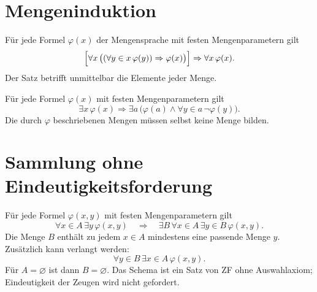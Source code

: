 \section{Mengeninduktion}

\begin{theorem}
\label{b03guide:thm:setinduction}
Für jede Formel $\varphi(x)$ der Mengensprache mit festen
Mengenparametern gilt
\[
 \Bigl[\forall x\,\bigl(
       (\forall y\in x\,\varphi(y))\Rightarrow\varphi(x)\bigr)\Bigr]
      \Rightarrow\forall x\,\varphi(x).
\]
Der Satz betrifft unmittelbar die Elemente jeder Menge.
\cite{miquel}
\end{theorem}

\begin{theorem}
Für jede Formel $\varphi(x)$ mit festen Mengenparametern gilt
\[
 \exists x\,\varphi(x)
 \Rightarrow
 \exists a\,\bigl(\varphi(a)\land
                    \forall y\in a\,\neg\varphi(y)\bigr).
\]
Die durch $\varphi$ beschriebenen Mengen müssen selbst keine
Menge bilden.
\end{theorem}

\section{Sammlung ohne Eindeutigkeitsforderung}

\begin{theorem}[Sammlungsschema]
\label{b03guide:thm:collection}
Für jede Formel $\varphi(x,y)$ mit festen Mengenparametern gilt
\[
 \forall x\in A\,\exists y\,\varphi(x,y)
 \quad\Rightarrow\quad
 \exists B\,\forall x\in A\,\exists y\in B\,\varphi(x,y).
\]
Die Menge $B$ enthält zu jedem $x\in A$ mindestens eine passende
Menge $y$. Zusätzlich kann verlangt werden:
\[
 \forall y\in B\,\exists x\in A\,\varphi(x,y).
\]
Für $A=\varnothing$ ist dann $B=\varnothing$.
Das Schema ist ein Satz von ZF ohne Auswahlaxiom; Eindeutigkeit
der Zeugen wird nicht gefordert. \cite{miquel,holland}
\end{theorem}

